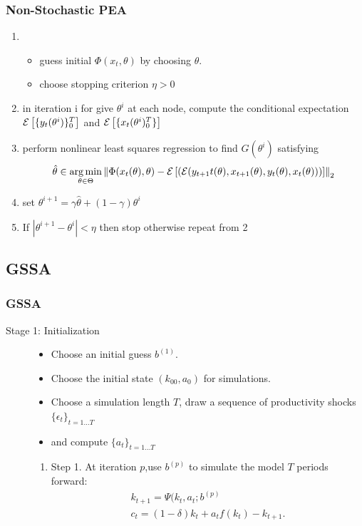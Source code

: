 \documentclass[tikz]{beamer}
\begin{document}
 \begin{frame}
  \frametitle{Non-Stochastic PEA}


    \begin{enumerate}
    \item \ 
      \begin{itemize}
      \item guess initial $\Phi(x_t,\theta)$ by choosing $\theta$. 
      \item choose stopping criterion $\eta>0$
      \end{itemize}
    \item in iteration i for give $\theta^i$ at each node, compute the conditional expectation
${\mathcal{E}\left [ \{y_t(\theta^i)\}^T_0 \right ]}$ and ${\mathcal{E}\left [ \{x_t(\theta^i)^T_0\} \right ]}$
\item perform nonlinear least squares regression to find $G(\theta^i)$ satisfying 
  \begin{gather}
    \hat{\theta} \in \operatorname*{arg\,min}_{\theta \in \Theta} \left\lVert\Phi(x_t(\theta),\theta)- {\mathcal{E}\left [ (\mathcal{E}(y_{t+1}t(\theta),x_{t+1}(\theta),y_t(\theta),x_t(\theta))) \right ]} \right\rVert_2
  \end{gather}
\item set $\theta^{i+1} = \gamma \hat{\theta} + (1-\gamma)\theta^i$
\item If $|\theta^{i+1} - \theta^i| < \eta$ then stop otherwise repeat from 2
    \end{enumerate}


 \end{frame}

   \subsection{GSSA}

 \begin{frame}
   \frametitle{GSSA}

\cite{juddGSSA2011}
 \begin{description}
\item[Stage 1: Initialization]
  \begin{itemize}
  \item  Choose an initial guess $b^{(1)}$.
 \item Choose the initial state $(k_00,a_0)$ for simulations. 
 \item  Choose a simulation length $T$, draw a sequence of 
  productivity shocks $\{\epsilon_t \}_{t=1\ldots T}$
  \item and compute $\{a_t \}_{t =1\ldots T}$
   \end{itemize}
   \begin{enumerate}
   \item 
 Step 1. At iteration $p$,use $b^(p)$ to simulate the model $T$ periods forward:
 \begin{gather}
 k_{t+1} = \Psi(k_t,a_t;b^{(p)}\\
 c_t = (1 − δ)k_t + a_tf(k_t) − k_{t+1}. 
 \end{gather}

   \end{enumerate}
 \end{description}

 \end{frame}
\end{document}

